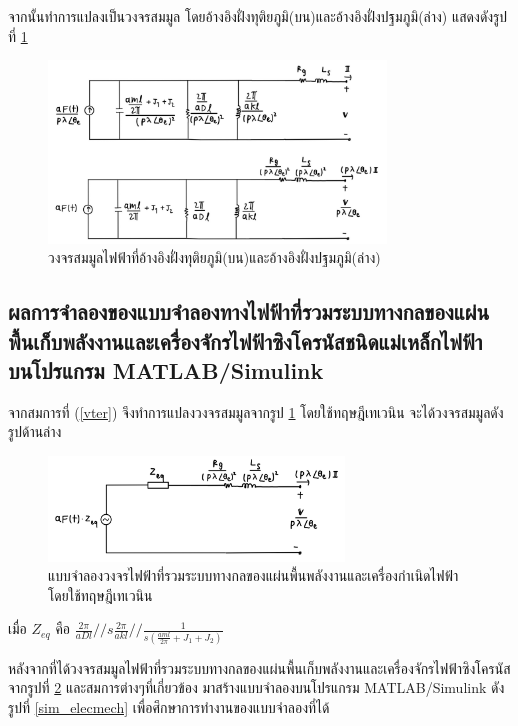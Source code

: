 \documentclass[11pt,a4paper]{article}
\begin{document}
จากนั้นทำการแปลงเป็นวงจรสมมูล โดยอ้างอิงฝั่งทุติยภูมิ(บน)และอ้างอิงฝั่งปฐมภูมิ(ล่าง) แสดงดังรูปที่ \ref{cir_mech_elec_3}
\begin{figure}[H]
    \begin{center}
        \includegraphics[width=0.8\textwidth]{cir_mech_elec_3.jpg}
    \end{center}
    \caption{วงจรสมมูลไฟฟ้าที่อ้างอิงฝั่งทุติยภูมิ(บน)และอ้างอิงฝั่งปฐมภูมิ(ล่าง)}
    \label{cir_mech_elec_3}
\end{figure}

\subsection{ผลการจำลองของแบบจำลองทางไฟฟ้าที่รวมระบบทางกลของแผ่นพื้นเก็บพลังงานและเครื่องจักรไฟฟ้าซิงโครนัสชนิดแม่เหล็กไฟฟ้า บนโปรแกรม MATLAB/Simulink}

จากสมการที่ (\ref{vter}) จึงทำการแปลงวงจรสมมูลจากรูป \ref{cir_mech_elec_3} โดยใช้ทฤษฎีเทเวนิน จะได้วงจรสมมูลดังรูปด้านล่าง
\begin{figure}[H]
    \begin{center}
        \includegraphics[width=0.7\textwidth]{cir_mech_elec_4.jpg}
    \end{center}
    \caption{แบบจำลองวงจรไฟฟ้าที่รวมระบบทางกลของแผ่นพื้นพลังงานและเครื่องกำเนิดไฟฟ้า โดยใช้ทฤษฎีเทเวนิน}
    \label{cir_mech_elec_4}
\end{figure}
เมื่อ $Z_{eq}$ คือ $ \frac{2\pi}{aDl} // s \frac{2\pi }{akl} // \frac{1}{s( \frac{aml}{2\pi} + J_{1} + J_{2} ) }   $

หลังจากที่ได้วงจรสมมูลไฟฟ้าที่รวมระบบทางกลของแผ่นพื้นเก็บพลังงานและเครื่องจักรไฟฟ้าซิงโครนัส จากรูปที่ \ref{cir_mech_elec_4} และสมการต่างๆที่เกี่ยวข้อง มาสร้างแบบจำลองบนโปรแกรม MATLAB/Simulink ดังรูปที่ \ref{sim_elecmech} เพื่อศึกษาการทำงานของแบบจำลองที่ได้
\end{document}
